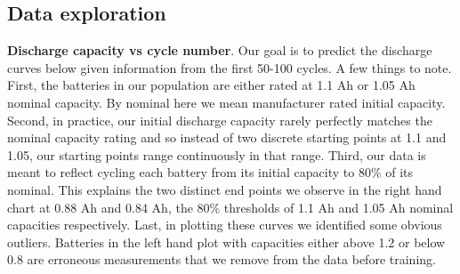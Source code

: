 \documentclass{article}
\begin{document}
\subsection{Data exploration}

\textbf{Discharge capacity vs cycle number}. Our goal is to predict the discharge curves below given information from the first 50-100 cycles. A few things to note. First, the batteries in our population are either rated at 1.1 Ah or 1.05 Ah nominal capacity. By nominal here we mean manufacturer rated initial capacity. Second, in practice, our initial discharge capacity rarely perfectly matches the nominal capacity rating and so instead of two discrete starting points at 1.1 and 1.05, our starting points range continuously in that range. Third, our data is meant to reflect cycling each battery from its initial capacity to 80\% of its nominal. This explains the two distinct end points we observe in the right hand chart at 0.88 Ah and 0.84 Ah, the 80\% thresholds of 1.1 Ah and 1.05 Ah nominal capacities respectively. Last, in plotting these curves we identified some obvious outliers. Batteries in the left hand plot with capacities either above 1.2 or below 0.8 are erroneous measurements that we remove from the data before training.  
\end{document}
